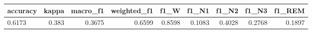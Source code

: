 \begin{tabular}{lrrrrrrrr}
\hline
accuracy & kappa & macro_f1 & weighted_f1 & f1_W & f1_N1 & f1_N2 & f1_N3 & f1_REM \\
\hline
0.6173 & 0.383 & 0.3675 & 0.6599 & 0.8598 & 0.1083 & 0.4028 & 0.2768 & 0.1897 \\
\hline
\end{tabular}
